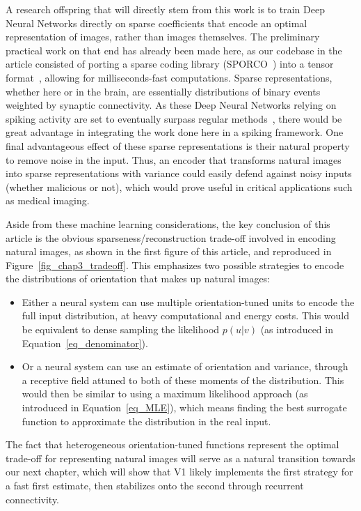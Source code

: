 A research offspring that will directly stem from this work is to train Deep Neural Networks directly on sparse coefficients that encode an optimal representation of images, rather than images themselves. The preliminary practical work on that end has already been made here, as our codebase in the article consisted of porting a sparse coding library (SPORCO~\cite{wohlberg2017sporco}) into a tensor format~\cite{paszke2017automatic}, allowing for milliseconds-fast computations. Sparse representations, whether here or in the brain, are essentially distributions of binary events weighted by synaptic connectivity. As these Deep Neural Networks relying on spiking activity are set to eventually surpass regular methods~\cite{eshraghian2022memristor, grimaldi2023learning}, there would be great advantage in integrating the work done here in a spiking framework. One final advantageous effect of these sparse representations is their natural property to remove noise in the input. Thus, an encoder that transforms natural images into sparse representations with variance could easily defend against noisy inputs (whether malicious or not), which would prove useful in critical applications such as medical imaging. 

Aside from these machine learning considerations, the key conclusion of this article is the obvious sparseness/reconstruction trade-off involved in encoding natural images, as shown in the first figure of this article, and reproduced in Figure~\ref{fig_chap3_tradeoff}. This emphasizes two possible strategies to encode the distributions of orientation that makes up natural images:
\begin{itemize}
    \item Either a neural system can use multiple orientation-tuned units to encode the full input distribution, at heavy computational and energy costs. This would be equivalent to dense sampling the likelihood $p(u|v)$ (as introduced in Equation~\ref{eq_denominator}).
    \item Or a neural system can use an estimate of orientation and variance, through a receptive field attuned to both of these moments of the distribution. This would then be similar to using a maximum likelihood approach (as introduced in Equation~\ref{eq_MLE}), which means finding the best surrogate function to approximate the distribution in the real input. 
\end{itemize} 
The fact that heterogeneous orientation-tuned functions represent the optimal trade-off for representing natural images will serve as a natural transition towards our next chapter, which will show that \gls{V1} likely implements the first strategy for a fast first estimate, then stabilizes onto the second through recurrent connectivity.

